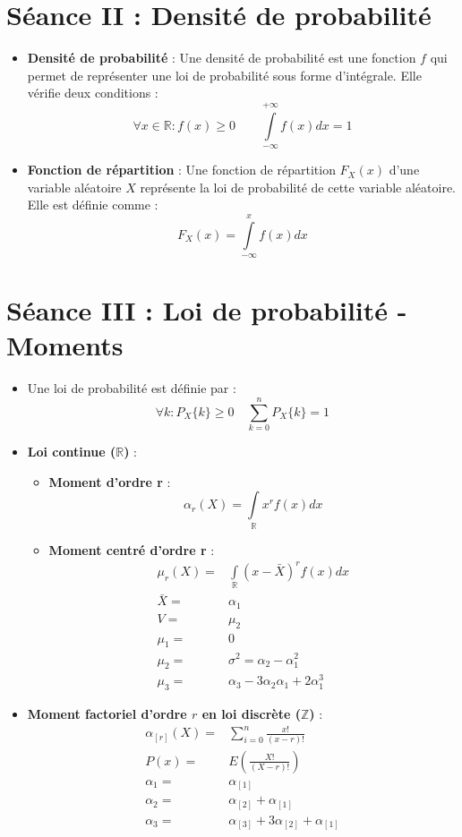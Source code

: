 \documentclass[a4paper,11pt]{report}
\begin{document}
\section{Séance II : Densité de probabilité}
\begin{itemize}
	\item \textbf{Densité de probabilité} : Une densité de probabilité est une fonction $f$ qui permet de représenter une loi de probabilité sous forme d'intégrale. Elle vérifie deux conditions :
		\[
			\forall x \in \mathbb{R} : f(x) \ge 0 \quad \quad
			\int\limits_{-\infty}^{+\infty}{f(x)dx}=1
		\]
	\item \textbf{Fonction de répartition} : Une fonction de répartition $F_X(x)$ d'une variable aléatoire $X$ représente la loi de probabilité de cette variable aléatoire. Elle est définie comme :
		\[
			F_X(x)=\int\limits_{-\infty}^{x}{f(x)dx}
		\]
\end{itemize}

\section{Séance III : Loi de probabilité - Moments}
\begin{itemize}
	\item Une loi de probabilité est définie par :
		\[
			\forall k : P_X\{k\} \ge 0 \quad
			\sum\limits_{k=0}^{n}{P_X\{k\}} = 1
		\]
	\item \textbf{Loi continue ($\mathbb{R}$)} :
	\begin{itemize}
		\item \textbf{Moment d'ordre r} :
			\[
				\alpha_r(X) = \int\limits_{\mathbb{R}}{x^rf(x)dx}
			\]
		\item \textbf{Moment centré d'ordre r} :
			\begin{align*}
				\mu_r(X) =& \int\limits_{\mathbb{R}}{\left(x-\bar{X}\right)^rf(x)dx} \\
				\bar{X} =& \alpha_1 \\
				V=&\mu_2 \\
				\mu_1 =& 0 \\
				\mu_2 =& \sigma^2 = \alpha_2 - \alpha_1^2 \\
				\mu_3 =& \alpha_3 - 3\alpha_2 \alpha_1 + 2\alpha_1^3
			\end{align*}
	\end{itemize}
	\item \textbf{Moment factoriel d'ordre $r$ en loi discrète ($\mathbb{Z}$)} :
		\begin{align*}
			\alpha_{[r]}(X) =& \sum\limits_{i = 0}^{n}{\frac{x!}{(x-r)!}} \\
			P(x) =& E\left(\frac{X!}{(X-r)!}\right) \\
			\alpha_1 =& \alpha_{[1]} \\
			\alpha_2 =& \alpha_{[2]} + \alpha_{[1]} \\
			\alpha_3 =& \alpha_{[3]} + 3\alpha_{[2]} + \alpha_{[1]}
		\end{align*}
\end{itemize}
\end{document}
